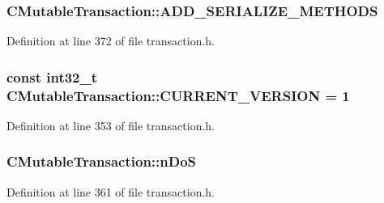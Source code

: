 \subsubsection[{A\+D\+D\+\_\+\+S\+E\+R\+I\+A\+L\+I\+Z\+E\+\_\+\+M\+E\+T\+H\+O\+D\+S}]{\setlength{\rightskip}{0pt plus 5cm}C\+Mutable\+Transaction\+::\+A\+D\+D\+\_\+\+S\+E\+R\+I\+A\+L\+I\+Z\+E\+\_\+\+M\+E\+T\+H\+O\+D\+S}\label{struct_c_mutable_transaction_addcc243750be876ebb36ad4badd8aff8}


Definition at line 372 of file transaction.\+h.

\hypertarget{struct_c_mutable_transaction_acd08f5ca3f1ffa5c65750e6b4594a1e7}{}
\subsubsection[{C\+U\+R\+R\+E\+N\+T\+\_\+\+V\+E\+R\+S\+I\+O\+N}]{\setlength{\rightskip}{0pt plus 5cm}const {\bf int32\+\_\+t} C\+Mutable\+Transaction\+::\+C\+U\+R\+R\+E\+N\+T\+\_\+\+V\+E\+R\+S\+I\+O\+N = 1\hspace{0.3cm}{\ttfamily [static]}}\label{struct_c_mutable_transaction_acd08f5ca3f1ffa5c65750e6b4594a1e7}


Definition at line 353 of file transaction.\+h.

\hypertarget{struct_c_mutable_transaction_a08262710c3dfcc221c48df31dc7f963e}{}
\subsubsection[{n\+Do\+S}]{ C\+Mutable\+Transaction\+::n\+Do\+S\hspace{0.3cm}{\ttfamily [mutable]}}\label{struct_c_mutable_transaction_a08262710c3dfcc221c48df31dc7f963e}


Definition at line 361 of file transaction.\+h.

\hypertarget{struct_c_mutable_transaction_ae9685a37d424cd00e3badda28260c848}{}
